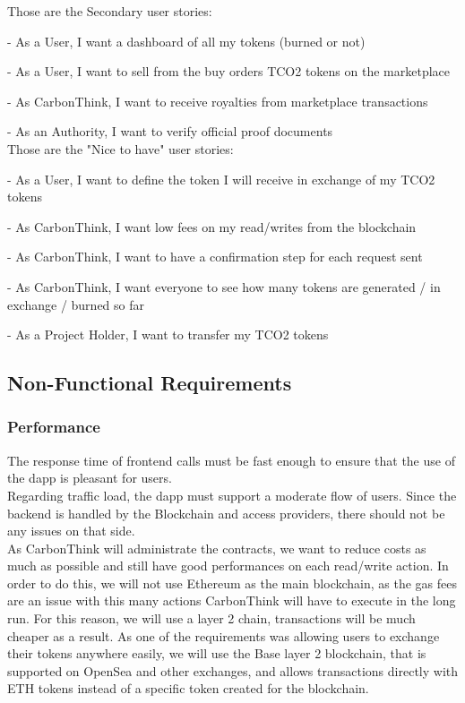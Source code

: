 \documentclass[a4paper, 12pt]{article}
\begin{document}
Those are the Secondary user stories:

- As a User, I want a dashboard of all my tokens (burned or not)

- As a User, I want to sell from the buy orders TCO2 tokens on the marketplace

- As CarbonThink, I want to receive royalties from marketplace transactions

- As an Authority, I want to verify official proof documents \\

Those are the "Nice to have" user stories:

- As a User, I want to define the token I will receive in exchange of my TCO2 tokens

- As CarbonThink, I want low fees on my read/writes from the blockchain

- As CarbonThink, I want to have a confirmation step for each request sent

- As CarbonThink, I want everyone to see how many tokens are generated / in exchange / burned so far

- As a Project Holder, I want to transfer my TCO2 tokens


\subsection{Non-Functional Requirements}
\subsubsection{Performance}

The response time of frontend calls must be fast enough to ensure that the use of the dapp is pleasant for users.\\

Regarding traffic load, the dapp must support a moderate flow of users. Since the backend is handled by the Blockchain and access providers, there should not be any issues on that side.\\

As CarbonThink will administrate the contracts, we want to reduce costs as much as possible and still have good performances on each read/write action. In order to do this, we will not use Ethereum as the main blockchain, as the gas fees are an issue with this many actions CarbonThink will have to execute in the long run. For this reason, we will use a layer 2 chain, transactions will be much cheaper as a result. As one of the requirements was allowing users to exchange their tokens anywhere easily, we will use the Base layer 2 blockchain, that is supported on OpenSea and other exchanges, and allows transactions directly with ETH tokens instead of a specific token created for the blockchain.
\end{document}
